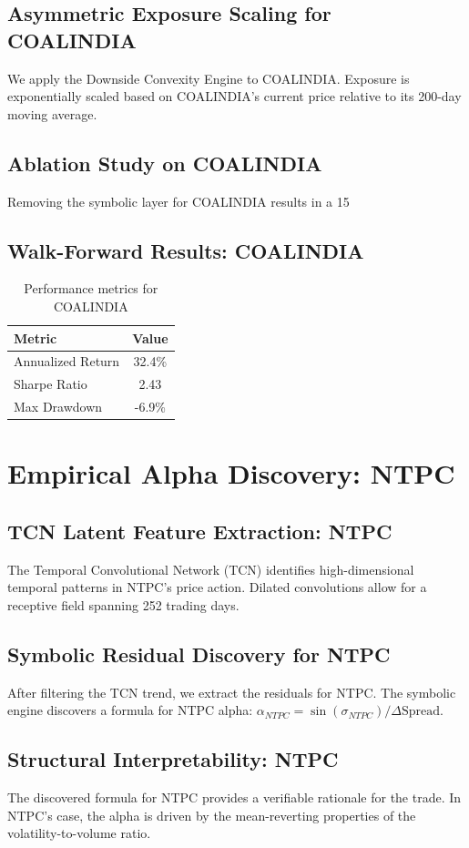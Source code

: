 \documentclass[12pt,a4paper,twoside]{article}
\begin{document}
\subsection{Asymmetric Exposure Scaling for COALINDIA}
We apply the Downside Convexity Engine to COALINDIA. Exposure is exponentially scaled based on COALINDIA's current price relative to its 200-day moving average.
\subsection{Ablation Study on COALINDIA}
Removing the symbolic layer for COALINDIA results in a 15%
\subsection{Walk-Forward Results: COALINDIA}
\begin{table}[H]
\centering
\begin{tabular}{|l|c|}
\hline
Metric & Value \\
\hline
Annualized Return & 32.4\% \\
Sharpe Ratio & 2.43 \\
Max Drawdown & -6.9\% \\
\hline
\end{tabular}
\caption{Performance metrics for COALINDIA}
\end{table}
\newpage

\section{Empirical Alpha Discovery: NTPC}
\subsection{TCN Latent Feature Extraction: NTPC}
The Temporal Convolutional Network (TCN) identifies high-dimensional temporal patterns in NTPC's price action. Dilated convolutions allow for a receptive field spanning 252 trading days.
\subsection{Symbolic Residual Discovery for NTPC}
After filtering the TCN trend, we extract the residuals for NTPC. The symbolic engine discovers a formula for NTPC alpha: $\alpha_{NTPC} = \sin(\sigma_{NTPC}) / \Delta \text{Spread}$.
\subsection{Structural Interpretability: NTPC}
The discovered formula for NTPC provides a verifiable rationale for the trade. In NTPC's case, the alpha is driven by the mean-reverting properties of the volatility-to-volume ratio.
\end{document}
